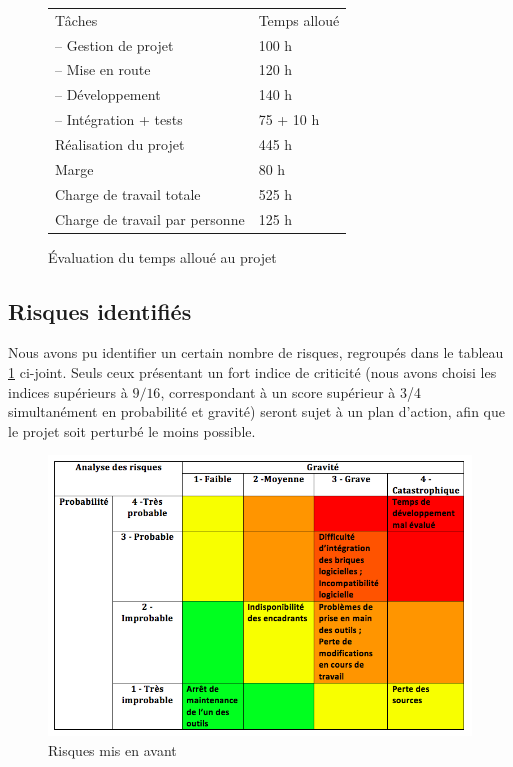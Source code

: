 \documentclass[a4paper,12pt]{report}
\begin{document}
\begin{figure}[!htb]
\centering
\begin{tabular}{ | p{7.5cm} | p{7.5cm} | }
\hline
Tâches & Temps alloué \\
– Gestion de projet & 100 h \\
– Mise en route & 120 h \\
– Développement & 140 h \\
– Intégration + tests & 75 + 10 h \\
\hline
Réalisation du projet & 445 h \\
\hline
Marge & 80 h \\
\hline
Charge de travail totale & 525 h \\
Charge de travail par personne & 125 h \\
\hline
\end{tabular}
\caption{Évaluation du temps alloué au projet}
\end{figure}




\subsection{Risques identifiés}
Nous avons pu identifier un certain nombre de risques, regroupés dans le tableau \ref{table:risques} ci-joint. Seuls ceux présentant un fort indice de criticité (nous avons choisi les indices supérieurs à $9/16$, correspondant à un score supérieur à 3/4 simultanément en probabilité et gravité) seront sujet à un plan d'action, afin que le projet soit perturbé le moins possible.

\begin{figure}[!htb]
\centering
\includegraphics[width=14cm]{risques.png}
\caption{Risques mis en avant}
\label{table:risques}
\end{figure}
\end{document}
